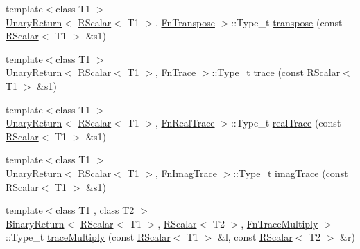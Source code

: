 \begin{DoxyCompactItemize}
\item 
{\footnotesize template$<$class T1 $>$ }\\\mbox{\hyperlink{structENSEM_1_1UnaryReturn}{Unary\+Return}}$<$ \mbox{\hyperlink{classENSEM_1_1RScalar}{R\+Scalar}}$<$ T1 $>$, \mbox{\hyperlink{structENSEM_1_1FnTranspose}{Fn\+Transpose}} $>$\+::Type\+\_\+t \mbox{\hyperlink{group__rscalar_ga0a32a83382be7e92236abd5dc654c18d}{transpose}} (const \mbox{\hyperlink{classENSEM_1_1RScalar}{R\+Scalar}}$<$ T1 $>$ \&s1)
\item 
{\footnotesize template$<$class T1 $>$ }\\\mbox{\hyperlink{structENSEM_1_1UnaryReturn}{Unary\+Return}}$<$ \mbox{\hyperlink{classENSEM_1_1RScalar}{R\+Scalar}}$<$ T1 $>$, \mbox{\hyperlink{structENSEM_1_1FnTrace}{Fn\+Trace}} $>$\+::Type\+\_\+t \mbox{\hyperlink{group__rscalar_ga0d92a68fbffd9e97af74d7c35b92536b}{trace}} (const \mbox{\hyperlink{classENSEM_1_1RScalar}{R\+Scalar}}$<$ T1 $>$ \&s1)
\item 
{\footnotesize template$<$class T1 $>$ }\\\mbox{\hyperlink{structENSEM_1_1UnaryReturn}{Unary\+Return}}$<$ \mbox{\hyperlink{classENSEM_1_1RScalar}{R\+Scalar}}$<$ T1 $>$, \mbox{\hyperlink{structENSEM_1_1FnRealTrace}{Fn\+Real\+Trace}} $>$\+::Type\+\_\+t \mbox{\hyperlink{group__rscalar_gad8c5ca0fef5f4bc08eb384e14b4017fa}{real\+Trace}} (const \mbox{\hyperlink{classENSEM_1_1RScalar}{R\+Scalar}}$<$ T1 $>$ \&s1)
\item 
{\footnotesize template$<$class T1 $>$ }\\\mbox{\hyperlink{structENSEM_1_1UnaryReturn}{Unary\+Return}}$<$ \mbox{\hyperlink{classENSEM_1_1RScalar}{R\+Scalar}}$<$ T1 $>$, \mbox{\hyperlink{structENSEM_1_1FnImagTrace}{Fn\+Imag\+Trace}} $>$\+::Type\+\_\+t \mbox{\hyperlink{group__rscalar_ga93f83573ea0cfc6dca10a8bf879ab0a7}{imag\+Trace}} (const \mbox{\hyperlink{classENSEM_1_1RScalar}{R\+Scalar}}$<$ T1 $>$ \&s1)
\item 
{\footnotesize template$<$class T1 , class T2 $>$ }\\\mbox{\hyperlink{structENSEM_1_1BinaryReturn}{Binary\+Return}}$<$ \mbox{\hyperlink{classENSEM_1_1RScalar}{R\+Scalar}}$<$ T1 $>$, \mbox{\hyperlink{classENSEM_1_1RScalar}{R\+Scalar}}$<$ T2 $>$, \mbox{\hyperlink{structENSEM_1_1FnTraceMultiply}{Fn\+Trace\+Multiply}} $>$\+::Type\+\_\+t \mbox{\hyperlink{group__rscalar_ga04705f685567963d28806500dd6dde85}{trace\+Multiply}} (const \mbox{\hyperlink{classENSEM_1_1RScalar}{R\+Scalar}}$<$ T1 $>$ \&l, const \mbox{\hyperlink{classENSEM_1_1RScalar}{R\+Scalar}}$<$ T2 $>$ \&r)

\end{DoxyCompactItemize}
